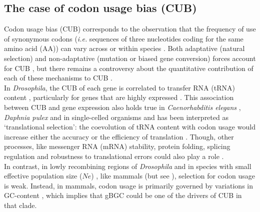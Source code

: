 \subsection{The case of codon usage bias (CUB)}

Codon usage bias (CUB) corresponds to the observation that the frequency of use of synonymous codons (\textit{i.e.} sequences of three nucleotides coding for the same amino acid (AA)) can vary across or within species \citep{fitch1976there}.
Both adaptative (natural selection) and non-adaptative (mutation \citep{marais2001synonymous} or biased gene conversion) forces account for CUB \citep{bulmer1991selectionmutationdrift,sharp1993codon,akashi1998translational}, but there remains a controversy about the quantitative contribution of each of these mechanisms to CUB \citep{pouyet2016etude}.\\

In \textit{Drosophila}, the CUB of each gene is correlated to transfer RNA (tRNA) content \citep{akashi1994synonymous,duret1999expression,bierne2006variation,behura2011coadaptation}, particularly for genes that are highly expressed \citep{chavancy1979adaptation,shields1988silent,moriyama1997codon}.
This association between CUB and gene expression also holds true in \textit{Caenorhabditis elegans} \citep{duret1999expression}, \textit{Daphnia pulex} \citep{lynch2017population} and in single-celled organisms \citep{bennetzen1982codon,gouy1982codon,ikemura1985codon,sharp1987rate,sharp1989codon} and has been interpreted as ‘translational selection’: the coevolution of tRNA content with codon usage would increase either the accuracy or the efficiency of translation \citep{sharp1995dna,duret2002evolution}.
Though, other processes, like messenger RNA (mRNA) stability, protein folding, splicing regulation and robustness to translational errors could also play a role \citep[reviewed in \citealp{clement2017evolutionary}]{chamary2006hearing,cusack2011preventing,plotkin2011synonymous}.\\

In contrast, in lowly recombining regions of \textit{Drosophila} \citep{kliman1993reduced} and in species with small effective population size ($Ne$) \citep{subramanian2008nearly,galtier2018codon}, like mammals (but see \citealp{chamary2006hearing}), selection for codon usage is weak.
Instead, in mammals, codon usage is primarily governed by variations in GC-content \citep[but see \citealp{doherty2013translational}]{semon2006no,rudolph2016codondriven,pouyet2017recombination}, which implies that gBGC could be one of the drivers of CUB in that clade.

